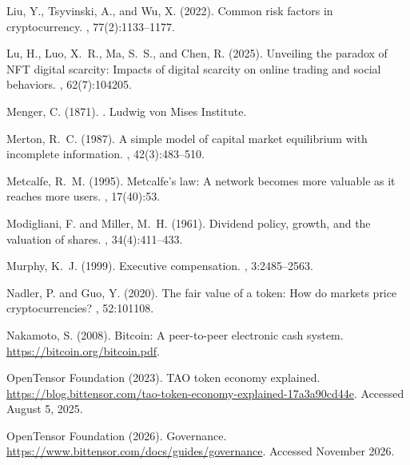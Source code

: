 \documentclass[12pt]{article}
\begin{document}
\begin{thebibliography}{}
Liu, Y., Tsyvinski, A., and Wu, X. (2022).
\newblock Common risk factors in cryptocurrency.
, 77(2):1133--1177.

Lu, H., Luo, X.~R., Ma, S.~S., and Chen, R. (2025).
\newblock Unveiling the paradox of NFT digital scarcity: Impacts of digital
  scarcity on online trading and social behaviors.
, 62(7):104205.

Menger, C. (1871).
.
\newblock Ludwig von Mises Institute.

Merton, R.~C. (1987).
\newblock A simple model of capital market equilibrium with incomplete
  information.
, 42(3):483--510.

Metcalfe, R.~M. (1995).
\newblock Metcalfe's law: A network becomes more valuable as it reaches more
  users.
, 17(40):53.

Modigliani, F. and Miller, M.~H. (1961).
\newblock Dividend policy, growth, and the valuation of shares.
, 34(4):411--433.

Murphy, K.~J. (1999).
\newblock Executive compensation.
, 3:2485--2563.

Nadler, P. and Guo, Y. (2020).
\newblock The fair value of a token: How do markets price cryptocurrencies?
, 52:101108.

Nakamoto, S. (2008).
\newblock Bitcoin: A peer-to-peer electronic cash system.
\newblock \url{https://bitcoin.org/bitcoin.pdf}.

{OpenTensor Foundation} (2023).
\newblock TAO token economy explained.
\newblock
  \url{https://blog.bittensor.com/tao-token-economy-explained-17a3a90cd44e}.
\newblock Accessed August 5, 2025.

{OpenTensor Foundation} (2026).
\newblock Governance.
\newblock \url{https://www.bittensor.com/docs/guides/governance}.
\newblock Accessed November 2026.


\end{thebibliography}
\end{document}
